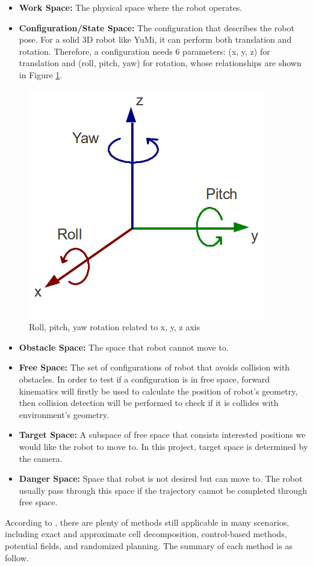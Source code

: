 \begin{itemize}
    \item \textbf{Work Space:} The physical space where the robot operates.
    \item \textbf{Configuration/State Space:} The configuration that describes the robot pose. For a solid 3D robot like YuMi, it can perform both translation and rotation. Therefore, a configuration needs 6 parameters: (x, y, z) for translation and (roll, pitch, yaw) for rotation, whose relationships are shown in Figure \ref{rpy}.
\end{itemize}

\begin{figure}[H]
\centering
\includegraphics[width = 0.4\columnwidth]{background/rpy.png}
\caption{Roll, pitch, yaw rotation related to x, y, z axis}
\label{rpy}
\end{figure}

\begin{itemize}
    \item \textbf{Obstacle Space:} The space that robot cannot move to. 
    \item \textbf{Free Space:} The set of configurations of robot that avoids collision with obstacles. In order to test if a configuration is in free space, forward kinematics will firstly be used to calculate the position of robot's geometry, then collision detection will be performed to check if it is collides with environment's geometry.
    \item \textbf{Target Space:} A subspace of free space that consists interested positions we would like the robot to move to. In this project, target space is determined by the camera.
    \item \textbf{Danger Space:} Space that robot is not desired but can move to. The robot usually pass through this space if the trajectory cannot be completed through free space.
\end{itemize}

According to \citep{OMPLPrim20:online}, there are plenty of methods still applicable in many scenarios, including exact and approximate cell decomposition, control-based methods, potential fields, and randomized planning. The summary of each method is as follow.

